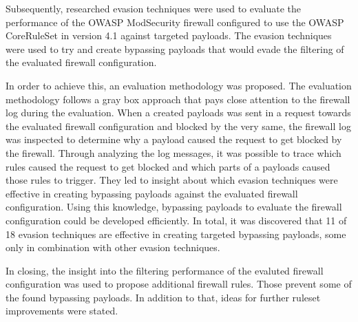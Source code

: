 Subsequently, researched evasion techniques were used to evaluate the performance of the OWASP ModSecurity firewall configured to use the OWASP CoreRuleSet in version 4.1 against targeted payloads. 
The evasion techniques were used to try and create bypassing payloads that would evade the filtering of the evaluated firewall configuration. 

In order to achieve this, an evaluation methodology was proposed. 
The evaluation methodology follows a gray box approach that pays close attention to the firewall log during the evaluation.
When a created payloads was sent in a request towards the evaluated firewall configuration and blocked by the very same, the firewall log was inspected to determine why a payload caused the request to get blocked by the firewall. 
Through analyzing the log messages, it was possible to trace which rules caused the request to get blocked and which parts of a payloads caused those rules to trigger. 
They led to insight about which evasion techniques were effective in creating bypassing payloads against the evaluated firewall configuration.
Using this knowledge, bypassing payloads to evaluate the firewall configuration could be developed efficiently.
In total, it was discovered that 11 of 18 evasion techniques are effective in creating targeted bypassing payloads, some only in combination with other evasion techniques. 

In closing, the insight into the filtering performance of the evaluted firewall configuration was used to propose additional firewall rules. Those prevent some of the found bypassing payloads. In addition to that, ideas for further ruleset improvements were stated.
